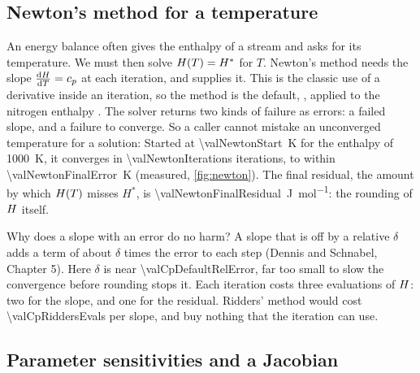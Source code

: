 \subsection{Newton's method for a temperature}\label{sec:using-newton}

An energy balance often gives the enthalpy of a stream and asks for its temperature. We must then solve
$H(T) = H^\ast$ for $T$. Newton's method needs the slope $\frac{\mathrm{d} H}{\mathrm{d} T} = c_p$ at each iteration, and
 supplies it. This is the classic use of a derivative inside an iteration, so the method is the
default, , applied to the nitrogen enthalpy . The solver returns two kinds of failure as
errors: a failed slope, and a failure to converge. So a caller cannot mistake an unconverged temperature for a
solution:
Started at \SI{\valNewtonStart}{K} for the enthalpy of \SI{1000}{K}, it converges in \num{\valNewtonIterations}
iterations, to within \SI{\valNewtonFinalError}{K} (measured, \cref{fig:newton}). The final residual, the amount by
which $H(T)$ misses $H^\ast$, is \SI{\valNewtonFinalResidual}{\joule\per\mole}: the rounding of $\enth$ itself.

Why does a slope with an error do no harm? A slope that is off by a relative $\delta$ adds a term of about $\delta$
times the error to each step (Dennis and Schnabel,\cite{dennis1996} Chapter 5). Here $\delta$ is near
\num{\valCpDefaultRelError}, far too small to slow the convergence before rounding stops it. Each iteration costs
three evaluations of $\enth$: two for the slope, and one for the residual. Ridders' method would cost
\num{\valCpRiddersEvals} per slope, and buy nothing that the iteration can use.
\begin{marginfigure}
\centering

\caption{Newton's residual $\abs{\enth(T) - H^\ast}$ against the iteration, with the slope from .
The number of correct digits doubles at each step, until the residual reaches the rounding of
$\enth$.\label{fig:newton}}
\end{marginfigure}

\subsection{Parameter sensitivities and a Jacobian}\label{sec:using-sensitivity}

